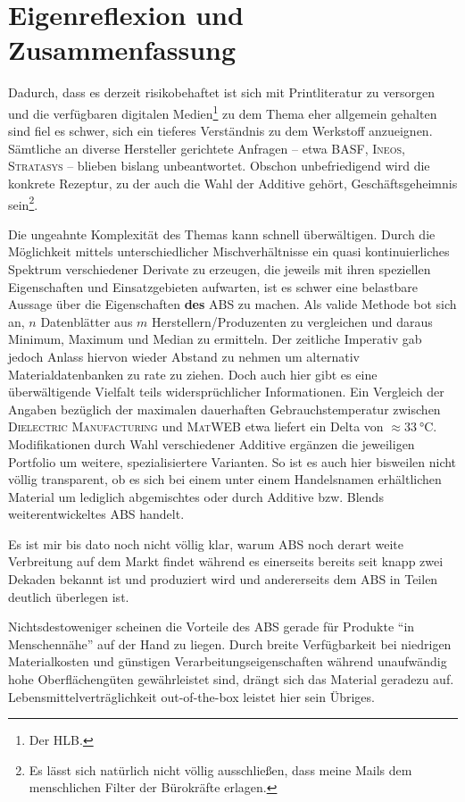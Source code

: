 \chapter{Eigenreflexion und Zusammenfassung}
    Dadurch, dass es derzeit risikobehaftet ist sich mit Printliteratur zu versorgen und die verfügbaren digitalen Medien\footnote{Der HLB.}
    zu dem Thema eher allgemein gehalten sind fiel es schwer, sich ein tieferes Verständnis zu dem Werkstoff anzueignen.
    Sämtliche an diverse Hersteller gerichtete Anfragen – etwa \textsc{BASF}, \textsc{Ineos}, \textsc{Stratasys} – blieben bislang unbeantwortet.
    Obschon unbefriedigend wird die konkrete Rezeptur, zu der auch die Wahl der Additive gehört, Geschäftsgeheimnis sein\footnote{Es lässt sich natürlich nicht völlig ausschließen, dass meine Mails dem menschlichen Filter der Bürokräfte erlagen.}.
    
    \medskip
    Die ungeahnte Komplexität des Themas kann schnell überwältigen. Durch die Möglichkeit mittels unterschiedlicher Mischverhältnisse
    ein quasi kontinuierliches Spektrum verschiedener Derivate zu erzeugen, die jeweils mit ihren speziellen Eigenschaften
    und Einsatzgebieten aufwarten, ist es schwer eine belastbare Aussage über die Eigenschaften \textbf{des} ABS zu machen.
    Als valide Methode bot sich an, \(n\) Datenblätter aus \(m\) Herstellern/Produzenten zu vergleichen und daraus Minimum,
    Maximum und Median zu ermitteln. Der zeitliche Imperativ gab jedoch Anlass hiervon wieder Abstand zu nehmen um
    alternativ Materialdatenbanken zu rate zu ziehen. Doch auch hier gibt es eine überwältigende Vielfalt teils widersprüchlicher Informationen.
    Ein Vergleich der Angaben bezüglich der maximalen dauerhaften Gebrauchstemperatur zwischen \textsc{Dielectric Manufacturing}\cite{ABS.Datasheet.dielectricmfg.20190227}
    und \textsc{MatWEB}\cite{materialdatenbank.ABS.matweb.com.20210210} etwa liefert ein Delta von \(\approx \SI{33}{\celsius}\).
    Modifikationen durch Wahl verschiedener Additive ergänzen die jeweiligen Portfolio um weitere, spezialisiertere Varianten.
    So ist es auch hier bisweilen nicht völlig transparent, ob es sich bei einem unter einem Handelsnamen erhältlichen Material
    um lediglich abgemischtes oder durch Additive bzw. Blends weiterentwickeltes ABS handelt.
    
    \medskip
    Es ist mir bis dato noch nicht völlig klar, warum ABS noch derart weite Verbreitung auf dem Markt findet während es
    einerseits bereits seit knapp zwei Dekaden bekannt ist und produziert wird und andererseits dem ABS in Teilen deutlich
    überlegen ist.

    Nichtsdestoweniger scheinen die Vorteile des ABS gerade für Produkte \enquote{in Menschennähe} auf der Hand zu liegen.
    Durch breite Verfügbarkeit bei niedrigen Materialkosten und günstigen Verarbeitungseigenschaften während unaufwändig hohe
    Oberflächengüten gewährleistet sind, drängt sich das Material geradezu auf. Lebensmittelverträglichkeit out-of-the-box
    leistet hier sein Übriges.

    \medskip
    